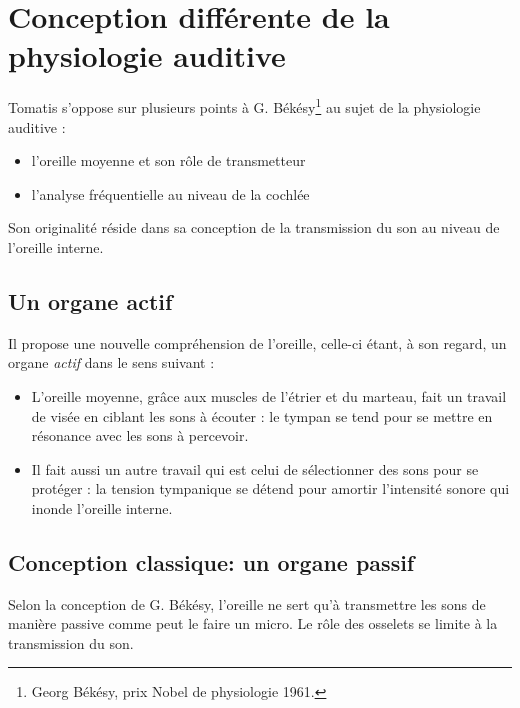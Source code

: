\section{Conception différente de la physiologie auditive}

Tomatis  s'oppose sur plusieurs points à G. Békésy\footnote{Georg Békésy, prix Nobel de physiologie 1961.} au sujet de la
physiologie auditive : 
\begin{itemize}
	\item l'oreille moyenne et son rôle de transmetteur 
	\item l'analyse fréquentielle au niveau de la cochlée
\end{itemize}

Son originalité réside dans sa conception de la transmission du son
au niveau de l'oreille interne. 

\subsection{Un organe actif}

Il propose une nouvelle compréhension de l'oreille, celle-ci étant,
à son regard, un organe \emph{actif} %
dans le sens suivant :
\begin{itemize}
	\item L'oreille moyenne, grâce aux muscles de l'étrier et du marteau, fait
		un travail de visée en ciblant les sons à écouter : le tympan se tend
		pour se mettre en résonance avec les sons à percevoir.
	\item Il fait aussi un autre travail qui est celui de sélectionner des sons
		pour se protéger : la tension tympanique se détend pour amortir l'intensité
		sonore qui inonde l'oreille interne. 
\end{itemize}

\subsection{Conception classique: un organe passif}

Selon la conception de G. Békésy,
l'oreille ne sert qu'à transmettre les sons de manière passive
comme peut le faire un micro. 
Le rôle des osselets se limite à la transmission du
son. 

